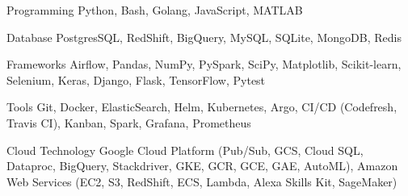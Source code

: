

\begin{cvskills}

  \cvskill
    {Programming} %
    {Python, Bash, Golang, JavaScript, MATLAB} %

  \cvskill
    {Database} %
    {PostgresSQL, RedShift, BigQuery, MySQL, SQLite, MongoDB, Redis} %


  \cvskill
    {Frameworks} %
    {Airflow, Pandas, NumPy, PySpark, SciPy, Matplotlib, Scikit-learn, Selenium, Keras, Django, Flask, TensorFlow, Pytest} %



  \cvskill
    {Tools} %
    {Git, Docker, ElasticSearch, Helm, Kubernetes, Argo,  CI/CD (Codefresh, Travis CI), Kanban, Spark, Grafana, Prometheus} %

  \cvskill
    {Cloud Technology} %
    {Google Cloud Platform (Pub/Sub, GCS, Cloud SQL, Dataproc, BigQuery, Stackdriver, GKE, GCR, GCE, GAE, AutoML), Amazon Web Services (EC2, S3, RedShift, ECS, Lambda, Alexa Skills Kit, SageMaker)} 




\end{cvskills}
